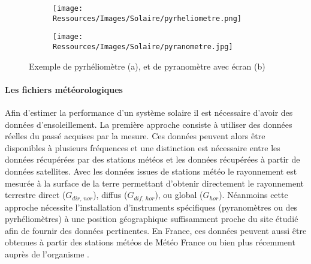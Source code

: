 \begin{figure}
    \centering
    \begin{subfigure}[b]{0.45\textwidth}
        \texttt{[image: Ressources/Images/Solaire/pyrheliometre.png]}
        \caption{}
        \label{fig:schema_pyrheliometre}
    \end{subfigure}
    \quad
    \begin{subfigure}[b]{0.45\textwidth}
        \texttt{[image: Ressources/Images/Solaire/pyranometre.jpg]}
        \caption{}
        \label{fig:schema_pyranometre}
    \end{subfigure}
    \caption[Exemple de pyrhéliomètre et de pyranomètre avec écran]
             {Exemple de pyrhéliomètre (a), et de pyranomètre avec écran (b)}
    \label{fig:image_mesure_rayonnement}
\end{figure}

\paragraph{Les fichiers météorologiques} %
\label{par:les_fichiers_meteorologiques}
Afin d’estimer la performance d’un système solaire il est nécessaire d’avoir des données
d’ensoleillement. La première approche consiste à utiliser des données réelles du passé
acquises par la mesure. Ces données peuvent alors être disponibles à plusieurs fréquences
et une distinction est nécessaire entre les données récupérées par des stations météos et
les données récupérées à partir de données satellites. Avec les données issues de stations
météo le rayonnement est mesurée à la surface de la terre permettant d’obtenir directement
le rayonnement terrestre direct ($G_{dir,\,nor}$), diffus ($G_{dif,\,hor}$), ou global
($G_{hor}$). Néanmoins cette approche nécessite l’installation d’instruments spécifiques
(pyranomètres ou des pyrhéliomètres) à une position géographique suffisamment proche du
site étudié afin de fournir des données pertinentes. En France, ces données peuvent aussi
être obtenues à partir des stations météos de Météo France ou bien plus récemment auprès
de l’organisme .

